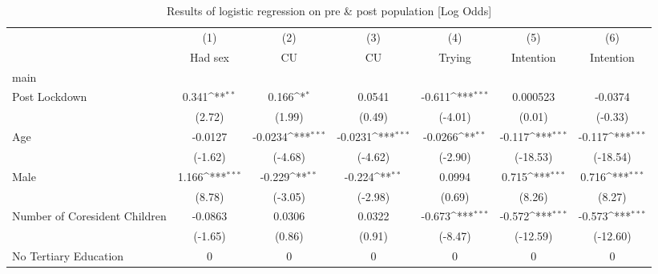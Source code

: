 \begin{table*}[htbp]\centering
\def\sym#1{\ifmmode^{#1}\else\(^{#1}\)\fi}
\caption{Results of logistic regression on pre \& post population [Log Odds]}
\hskip-4.5cm\begin{tabular}{l*{6}{c}}
\hline\hline
                    &\multicolumn{1}{c}{(1)}&\multicolumn{1}{c}{(2)}&\multicolumn{1}{c}{(3)}&\multicolumn{1}{c}{(4)}&\multicolumn{1}{c}{(5)}&\multicolumn{1}{c}{(6)}\\
                    &\multicolumn{1}{c}{Had sex}&\multicolumn{1}{c}{CU}&\multicolumn{1}{c}{CU}&\multicolumn{1}{c}{Trying}&\multicolumn{1}{c}{Intention}&\multicolumn{1}{c}{Intention}\\
\hline
main                &                     &                     &                     &                     &                     &                     \\
Post Lockdown       &       0.341\sym{**} &       0.166\sym{*}  &      0.0541         &      -0.611\sym{***}&    0.000523         &     -0.0374         \\
                    &      (2.72)         &      (1.99)         &      (0.49)         &     (-4.01)         &      (0.01)         &     (-0.33)         \\
[1em]
Age                 &     -0.0127         &     -0.0234\sym{***}&     -0.0231\sym{***}&     -0.0266\sym{**} &      -0.117\sym{***}&      -0.117\sym{***}\\
                    &     (-1.62)         &     (-4.68)         &     (-4.62)         &     (-2.90)         &    (-18.53)         &    (-18.54)         \\
[1em]
Male                &       1.166\sym{***}&      -0.229\sym{**} &      -0.224\sym{**} &      0.0994         &       0.715\sym{***}&       0.716\sym{***}\\
                    &      (8.78)         &     (-3.05)         &     (-2.98)         &      (0.69)         &      (8.26)         &      (8.27)         \\
[1em]
Number of Coresident Children&     -0.0863         &      0.0306         &      0.0322         &      -0.673\sym{***}&      -0.572\sym{***}&      -0.573\sym{***}\\
                    &     (-1.65)         &      (0.86)         &      (0.91)         &     (-8.47)         &    (-12.59)         &    (-12.60)         \\
[1em]
No Tertiary Education&           0         &           0         &           0         &           0         &           0         &           0         \\

\end{tabular}
\end{table*}
